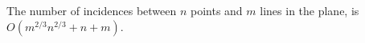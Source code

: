 \begin{theorem}
	The number of incidences between $n$ points and $m$ lines in the plane, is
	$O(m^{2/3}n^{2/3}+n+m)$.
\end{theorem}
